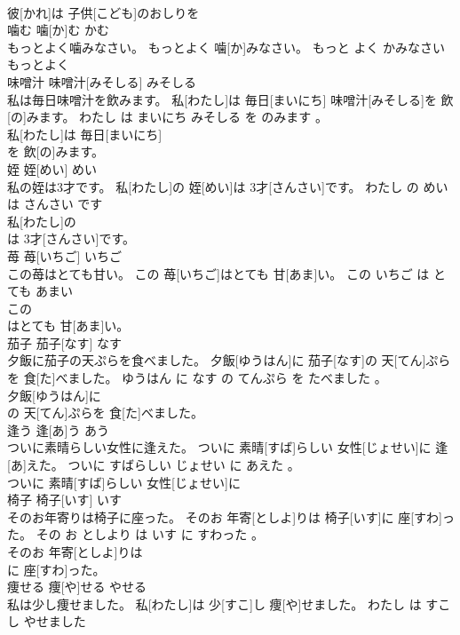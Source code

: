 \documentclass[8pt]{extreport}
\begin{document}
\begin{CJK}{UTF8}{min}
\\	彼[かれ]は 子供[こども]のおしりを
\\	噛む	噛[か]む	かむ	
\\	もっとよく噛みなさい。	もっとよく 噛[か]みなさい。	もっと よく かみなさい	
\\	もっとよく
\\	味噌汁	味噌汁[みそしる]	みそしる	
\\	私は毎日味噌汁を飲みます。	私[わたし]は 毎日[まいにち] 味噌汁[みそしる]を 飲[の]みます。	わたし は まいにち みそしる を のみます 。	
\\	私[わたし]は 毎日[まいにち]
\\	を 飲[の]みます。			
\\	姪	姪[めい]	めい	
\\	私の姪は3才です。	私[わたし]の 姪[めい]は 3才[さんさい]です。	わたし の めい は さんさい です	
\\	私[わたし]の
\\	は 3才[さんさい]です。			
\\	苺	苺[いちご]	いちご	
\\	この苺はとても甘い。	この 苺[いちご]はとても 甘[あま]い。	この いちご は とても あまい	
\\	この
\\	はとても 甘[あま]い。			
\\	茄子	茄子[なす]	なす	
\\	夕飯に茄子の天ぷらを食べました。	夕飯[ゆうはん]に 茄子[なす]の 天[てん]ぷらを 食[た]べました。	ゆうはん に なす の てんぷら を たべました 。	
\\	夕飯[ゆうはん]に
\\	の 天[てん]ぷらを 食[た]べました。			
\\	逢う	逢[あ]う	あう	
\\	ついに素晴らしい女性に逢えた。	ついに 素晴[すば]らしい 女性[じょせい]に 逢[あ]えた。	ついに すばらしい じょせい に あえた 。	
\\	ついに 素晴[すば]らしい 女性[じょせい]に
\\	椅子	椅子[いす]	いす	
\\	そのお年寄りは椅子に座った。	そのお 年寄[としよ]りは 椅子[いす]に 座[すわ]った。	その お としより は いす に すわった 。	
\\	そのお 年寄[としよ]りは
\\	に 座[すわ]った。			
\\	痩せる	痩[や]せる	やせる	
\\	私は少し痩せました。	私[わたし]は 少[すこ]し 痩[や]せました。	わたし は すこし やせました	

\end{CJK}
\end{document}
